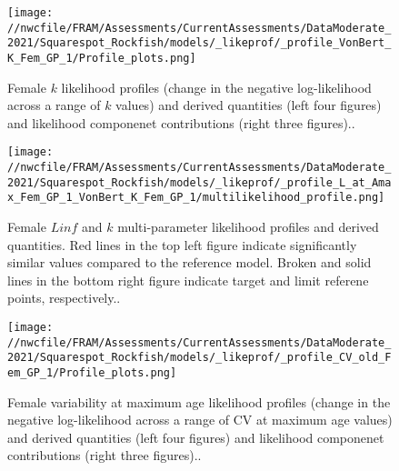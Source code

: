 \documentclass[11pt,
  english,
  a4paper,
]{article}
\begin{document}
\begin{figure}
\centering
\texttt{[image: //nwcfile/FRAM/Assessments/CurrentAssessments/DataModerate\_2021/Squarespot\_Rockfish/models/\_likeprof/\_profile\_VonBert\_K\_Fem\_GP\_1/Profile\_plots.png]}
\caption{Female {\(k\)\leavevmode\tagmcend\tagstructend} likelihood profiles (change in the negative log-likelihood across a range of {\(k\)\leavevmode\tagmcend\tagstructend} values) and derived quantities (left four figures) and likelihood componenet contributions (right three figures)..\label{fig:k_f-profile-combo}}
\end{figure}

\tagmcend\tagstructend


\begin{figure}
\centering
\texttt{[image: //nwcfile/FRAM/Assessments/CurrentAssessments/DataModerate\_2021/Squarespot\_Rockfish/models/\_likeprof/\_profile\_L\_at\_Amax\_Fem\_GP\_1\_VonBert\_K\_Fem\_GP\_1/multilikelihood\_profile.png]}
\caption{Female {\(Linf\)\leavevmode\tagmcend\tagstructend} and {\(k\)\leavevmode\tagmcend\tagstructend} multi-parameter likelihood profiles and derived quantities. Red lines in the top left figure indicate significantly similar values compared to the reference model. Broken and solid lines in the bottom right figure indicate target and limit referene points, respectively..\label{fig:Linf_k_f-profile}}
\end{figure}

\tagmcend\tagstructend


\begin{figure}
\centering
\texttt{[image: //nwcfile/FRAM/Assessments/CurrentAssessments/DataModerate\_2021/Squarespot\_Rockfish/models/\_likeprof/\_profile\_CV\_old\_Fem\_GP\_1/Profile\_plots.png]}
\caption{Female variability at maximum age likelihood profiles (change in the negative log-likelihood across a range of CV at maximum age values) and derived quantities (left four figures) and likelihood componenet contributions (right three figures)..\label{fig:CVold_f-profile-combo}}
\end{figure}
\end{document}
